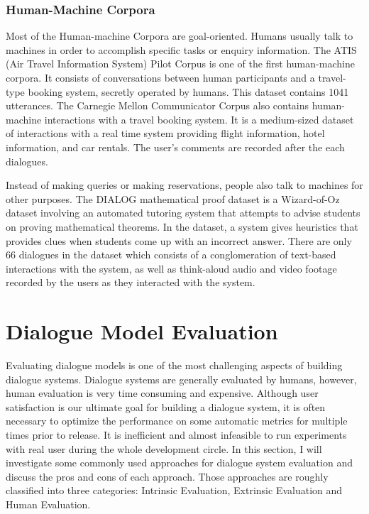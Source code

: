 \documentclass[bsc,frontabs,twoside,singlespacing,parskip,deptreport]{infthesis}     %
\begin{document}
\subsubsection*{Human-Machine Corpora}

Most of the Human-machine Corpora are goal-oriented. Humans usually talk to machines in order to accomplish specific tasks or enquiry information. The ATIS (Air Travel Information System) Pilot Corpus\cite{hemphill1990atis} is one of the first human-machine corpora. It consists of conversations between human participants and a travel-type booking system, secretly operated by humans. This dataset contains 1041 utterances. The Carnegie Mellon Communicator Corpus\cite{bennett2002carnegie} also contains human-machine interactions with a travel booking system. It is a medium-sized dataset of interactions with a real time system providing flight information, hotel information, and car rentals. The user’s comments are recorded after the each dialogues.

Instead of making queries or making reservations, people also talk to machines for other purposes. The DIALOG mathematical proof dataset\cite{wolska2004annotated} is a Wizard-of-Oz dataset involving an automated tutoring system that attempts to advise students on proving mathematical theorems. In the dataset, a system gives heuristics that provides clues when students come up with an incorrect answer. There are only 66 dialogues in the dataset which consists of a conglomeration of text-based interactions with the system, as well as think-aloud audio and video footage recorded by the users as they interacted with the system. 


\section{Dialogue Model Evaluation}

Evaluating dialogue models is one of the most challenging aspects of building dialogue systems. Dialogue systems are generally evaluated by humans, however, human evaluation is very time consuming and expensive. Although user satisfaction is our ultimate goal for building a dialogue system, it is often necessary to optimize the performance on some automatic metrics for multiple times prior to release. It is inefficient and almost infeasible to run experiments with real user during the whole development circle. In this section, I will investigate some commonly used approaches for dialogue system evaluation and discuss the pros and cons of each approach. Those approaches are roughly classified into three categories: Intrinsic Evaluation, Extrinsic Evaluation and Human Evaluation.
\end{document}
